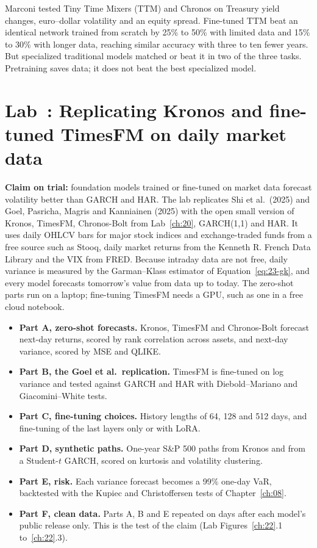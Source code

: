 Marconi tested Tiny Time Mixers (TTM) and Chronos on Treasury yield changes, euro--dollar volatility and an equity spread. Fine-tuned TTM beat an identical network trained from scratch by 25\% to 50\% with limited data and 15\% to 30\% with longer data, reaching similar accuracy with three to ten fewer years. But specialized traditional models matched or beat it in two of the three tasks. Pretraining saves data; it does not beat the best specialized model.

\section{Lab~\thechapter: Replicating Kronos and fine-tuned TimesFM on daily market data}
\label{sec:23-lab}

\textbf{Claim on trial:} foundation models trained or fine-tuned on market data forecast volatility better than GARCH and HAR. The lab replicates Shi et al.\ (2025) and Goel, Pasricha, Magris and Kanniainen (2025) with the open small version of Kronos, TimesFM, Chronos-Bolt from Lab~\ref{ch:20}, GARCH(1,1) and HAR. It uses daily OHLCV bars for major stock indices and exchange-traded funds from a free source such as Stooq, daily market returns from the Kenneth R. French Data Library and the VIX from FRED. Because intraday data are not free, daily variance is measured by the Garman--Klass estimator of Equation~\eqref{eq:23-gk}, and every model forecasts tomorrow's value from data up to today. The zero-shot parts run on a laptop; fine-tuning TimesFM needs a GPU, such as one in a free cloud notebook.

\begin{itemize}
  \item \textbf{Part A, zero-shot forecasts.} Kronos, TimesFM and Chronos-Bolt forecast next-day returns, scored by rank correlation across assets, and next-day variance, scored by MSE and QLIKE.
  \item \textbf{Part B, the Goel et al.\ replication.} TimesFM is fine-tuned on log variance and tested against GARCH and HAR with Diebold--Mariano and Giacomini--White tests.
  \item \textbf{Part C, fine-tuning choices.} History lengths of 64, 128 and 512 days, and fine-tuning of the last layers only or with LoRA.
  \item \textbf{Part D, synthetic paths.} One-year S\&P 500 paths from Kronos and from a Student-$t$ GARCH, scored on kurtosis and volatility clustering.
  \item \textbf{Part E, risk.} Each variance forecast becomes a 99\% one-day VaR, backtested with the Kupiec and Christoffersen tests of Chapter~\ref{ch:08}.
  \item \textbf{Part F, clean data.} Parts A, B and E repeated on days after each model's public release only. This is the test of the claim (Lab Figures~\ref{ch:22}.1 to~\ref{ch:22}.3).
\end{itemize}


